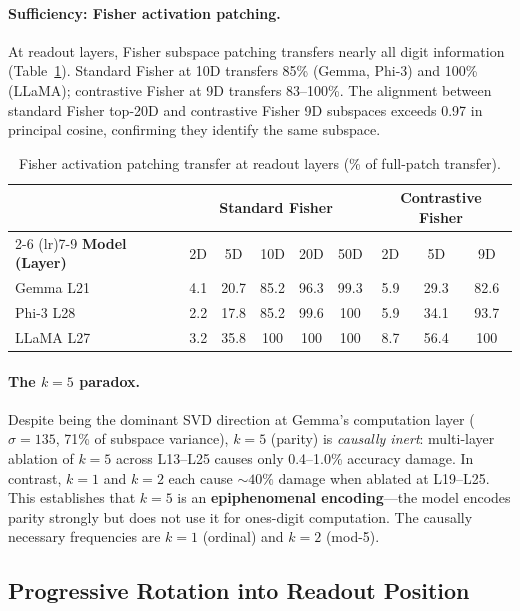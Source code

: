 \paragraph{Sufficiency: Fisher activation patching.} At readout layers, Fisher subspace patching transfers nearly all digit information (Table~\ref{tab:fisher}). Standard Fisher at 10D transfers 85\% (Gemma, Phi-3) and 100\% (LLaMA); contrastive Fisher at 9D transfers 83--100\%. The alignment between standard Fisher top-20D and contrastive Fisher 9D subspaces exceeds 0.97 in principal cosine, confirming they identify the same subspace.

\begin{table}[t]
\centering
\caption{Fisher activation patching transfer at readout layers (\% of full-patch transfer).}
\label{tab:fisher}
\small
\begin{tabular}{lccccc|ccc}
\toprule
& \multicolumn{5}{c}{\textbf{Standard Fisher}} & \multicolumn{3}{c}{\textbf{Contrastive Fisher}} \\
\cmidrule(lr){2-6} \cmidrule(lr){7-9}
\textbf{Model (Layer)} & 2D & 5D & 10D & 20D & 50D & 2D & 5D & 9D \\
\midrule
Gemma L21 & 4.1 & 20.7 & 85.2 & 96.3 & 99.3 & 5.9 & 29.3 & 82.6 \\
Phi-3 L28 & 2.2 & 17.8 & 85.2 & 99.6 & 100 & 5.9 & 34.1 & 93.7 \\
LLaMA L27 & 3.2 & 35.8 & 100 & 100 & 100 & 8.7 & 56.4 & 100 \\
\bottomrule
\end{tabular}
\end{table}

\paragraph{The $k{=}5$ paradox.} Despite being the dominant SVD direction at Gemma's computation layer ($\sigma{=}135$, 71\% of subspace variance), $k{=}5$ (parity) is \emph{causally inert}: multi-layer ablation of $k{=}5$ across L13--L25 causes only 0.4--1.0\% accuracy damage. In contrast, $k{=}1$ and $k{=}2$ each cause ${\sim}40\%$ damage when ablated at L19--L25. This establishes that $k{=}5$ is an \textbf{epiphenomenal encoding}---the model encodes parity strongly but does not use it for ones-digit computation. The causally necessary frequencies are $k{=}1$ (ordinal) and $k{=}2$ (mod-5).


\subsection{Progressive Rotation into Readout Position}
\label{sec:rotation}

